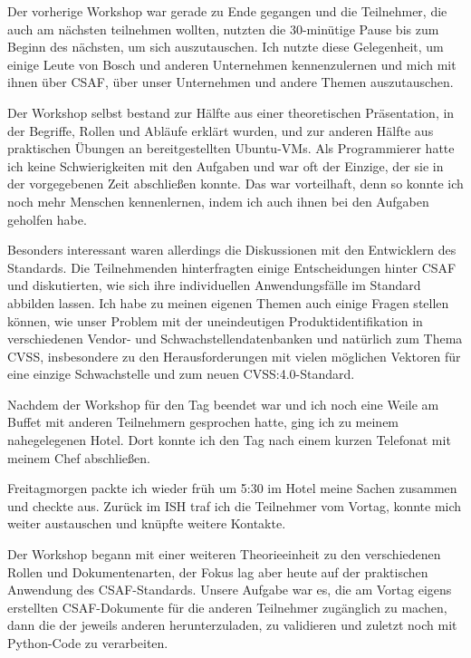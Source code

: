 Der vorherige Workshop war gerade zu Ende gegangen und die Teilnehmer, die auch am nächsten teilnehmen wollten, nutzten die 30-minütige Pause bis zum Beginn des nächsten, um sich auszutauschen.
Ich nutzte diese Gelegenheit, um einige Leute von Bosch und anderen Unternehmen kennenzulernen und mich mit ihnen über CSAF, über unser Unternehmen und andere Themen auszutauschen.

Der Workshop selbst bestand zur Hälfte aus einer theoretischen Präsentation, in der Begriffe, Rollen und Abläufe erklärt wurden, und zur anderen Hälfte aus praktischen Übungen an bereitgestellten Ubuntu-VMs.
Als Programmierer hatte ich keine Schwierigkeiten mit den Aufgaben und war oft der Einzige, der sie in der vorgegebenen Zeit abschließen konnte.
Das war vorteilhaft, denn so konnte ich noch mehr Menschen kennenlernen, indem ich auch ihnen bei den Aufgaben geholfen habe.

Besonders interessant waren allerdings die Diskussionen mit den Entwicklern des Standards.
Die Teilnehmenden hinterfragten einige Entscheidungen hinter CSAF und diskutierten, wie sich ihre individuellen Anwendungsfälle im Standard abbilden lassen.
Ich habe zu meinen eigenen Themen auch einige Fragen stellen können, wie unser Problem mit der uneindeutigen Produktidentifikation in verschiedenen Vendor- und Schwachstellendatenbanken und natürlich zum Thema CVSS, insbesondere zu den Herausforderungen mit vielen möglichen Vektoren für eine einzige Schwachstelle und zum neuen CVSS:4.0-Standard.

Nachdem der Workshop für den Tag beendet war und ich noch eine Weile am Buffet mit anderen Teilnehmern gesprochen hatte, ging ich zu meinem nahegelegenen Hotel.
Dort konnte ich den Tag nach einem kurzen Telefonat mit meinem Chef abschließen.

\sweekdaymarginpar{\weekdayFridayLong}

Freitagmorgen packte ich wieder früh um 5:30 im Hotel meine Sachen zusammen und checkte aus.
Zurück im ISH traf ich die Teilnehmer vom Vortag, konnte mich weiter austauschen und knüpfte weitere Kontakte.

Der Workshop begann mit einer weiteren Theorieeinheit zu den verschiedenen Rollen und Dokumentenarten, der Fokus lag aber heute auf der praktischen Anwendung des CSAF-Standards.
Unsere Aufgabe war es, die am Vortag eigens erstellten CSAF-Dokumente für die anderen Teilnehmer zugänglich zu machen, dann die der jeweils anderen herunterzuladen, zu validieren und zuletzt noch mit Python-Code zu verarbeiten.

